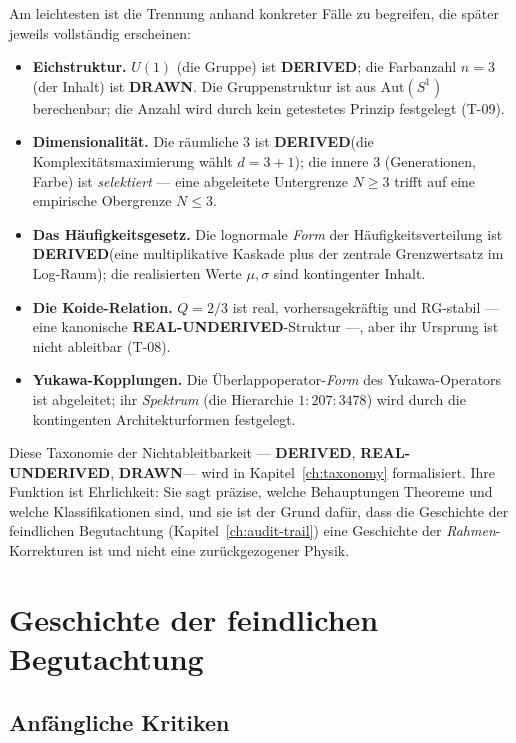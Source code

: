 \documentclass[10pt,twoside,openany]{book}
\newcommand{\derived}{\textbf{DERIVED}}
\newcommand{\realunder}{\textbf{REAL-UNDERIVED}}
\newcommand{\drawn}{\textbf{DRAWN}}
\begin{document}
Am leichtesten ist die Trennung anhand konkreter Fälle zu begreifen, die später jeweils
vollständig erscheinen:

\begin{itemize}
\item \textbf{Eichstruktur.} $U(1)$ (die Gruppe) ist \derived; die Farbanzahl $n=3$
(der Inhalt) ist \drawn. Die Gruppenstruktur ist aus $\mathrm{Aut}(S^1)$ berechenbar; die
Anzahl wird durch kein getestetes Prinzip festgelegt (T-09).
\item \textbf{Dimensionalität.} Die räumliche $3$ ist \derived (die
Komplexitätsmaximierung wählt $d=3{+}1$); die innere $3$ (Generationen, Farbe) ist
\emph{selektiert} --- eine abgeleitete Untergrenze $N\ge3$ trifft auf eine empirische
Obergrenze $N\le3$.
\item \textbf{Das Häufigkeitsgesetz.} Die lognormale \emph{Form} der
Häufigkeitsverteilung ist \derived (eine multiplikative Kaskade plus der zentrale
Grenzwertsatz im Log-Raum); die realisierten Werte $\mu,\sigma$ sind kontingenter Inhalt.
\item \textbf{Die Koide-Relation.} $Q=2/3$ ist real, vorhersagekräftig und RG-stabil ---
eine kanonische \realunder-Struktur ---, aber ihr Ursprung ist nicht ableitbar (T-08).
\item \textbf{Yukawa-Kopplungen.} Die Überlappoperator-\emph{Form} des Yukawa-Operators
ist abgeleitet; ihr \emph{Spektrum} (die Hierarchie $1{:}207{:}3478$) wird durch die
kontingenten Architekturformen festgelegt.
\end{itemize}

Diese Taxonomie der Nichtableitbarkeit --- \derived, \realunder, \drawn --- wird in
Kapitel~\ref{ch:taxonomy} formalisiert. Ihre Funktion ist Ehrlichkeit: Sie sagt präzise,
welche Behauptungen Theoreme und welche Klassifikationen sind, und sie ist der Grund
dafür, dass die Geschichte der feindlichen Begutachtung
(Kapitel~\ref{ch:audit-trail}) eine Geschichte der \emph{Rahmen}-Korrekturen ist und
nicht eine zurückgezogener Physik.

\chapter{Geschichte der feindlichen Begutachtung}
\label{ch:review-history}

\section{Anfängliche Kritiken}
\end{document}

